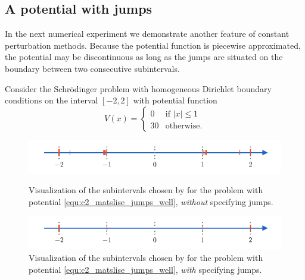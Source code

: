\subsection{A potential with jumps}

In the next numerical experiment we demonstrate another feature of constant perturbation methods. Because the potential function is piecewise approximated, the potential may be discontinuous as long as the jumps are situated on the boundary between two consecutive subintervals.

Consider the Schrödinger problem with homogeneous Dirichlet boundary conditions on the interval $[-2, 2]$ with potential function
\begin{equation}\label{equ:c2_matslise_jumps_well}
    V(x) = \begin{cases}
        0  & \text{if $|x| \leq 1$} \\
        30 & \text{otherwise.}
    \end{cases}
\end{equation}

\begin{figure}
    \begin{center}
        \includegraphics[width=\textwidth]{img/chapter2/matslise_jumps_without.pdf}
    \end{center}
    \caption{Visualization of the subintervals chosen by  for the problem with potential \eqref{equ:c2_matslise_jumps_well}, \emph{without} specifying jumps.}
    \label{fig:c2_matslise_jumps_without}
    \vspace{8mm}
    \begin{center}
        \includegraphics[width=\textwidth]{img/chapter2/matslise_jumps_with.pdf}
    \end{center}
    \caption{Visualization of the subintervals chosen by  for the problem with potential \eqref{equ:c2_matslise_jumps_well}, \emph{with} specifying jumps.}
    \label{fig:c2_matslise_jumps_with}
\end{figure}

